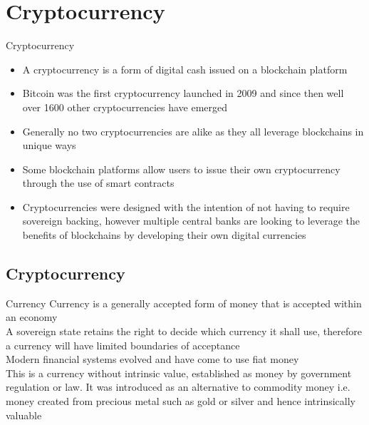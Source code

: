 \documentclass[11pt]{beamer}
\begin{document}

\section{Cryptocurrency}

\begin{frame}
	\begin{center}
		\begin{large}
			Cryptocurrency
		\end{large}
	\end{center}
\end{frame}



\begin{frame}{}
	\begin{itemize}
		\item A cryptocurrency is a form of digital cash issued on a blockchain platform
		\item Bitcoin was the first cryptocurrency launched in 2009 and since then well over 1600 other cryptocurrencies have emerged
		\item Generally no two cryptocurrencies are alike as they all leverage blockchains in unique ways
		\item Some blockchain platforms allow users to issue their own cryptocurrency through the use of smart contracts
		\item Cryptocurrencies were designed with the intention of not having to require sovereign backing, however multiple central banks are looking to leverage the benefits of blockchains by developing their own digital currencies
	\end{itemize}
\end{frame}


\subsection{Cryptocurrency}

\begin{frame}{Currency}
	Currency is a generally accepted form of money that is accepted within an economy\\ \vspace{3mm}
	A sovereign state retains the right to decide which currency it shall use, therefore a currency will have limited boundaries of acceptance \\ \vspace{3mm}
	Modern financial systems evolved and have come to use fiat money\\ \vspace{3mm}
	This is a currency without intrinsic value, established as money by government regulation or law. It was introduced as an alternative to commodity money i.e. money created from precious metal such as gold or silver and hence intrinsically valuable
\end{frame}
\end{document}
